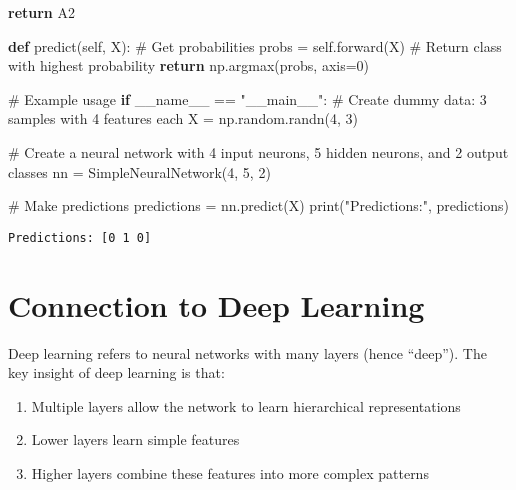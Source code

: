 \documentclass[
  letterpaper,
  DIV=11,
  numbers=noendperiod]{scrreprt}
\newenvironment{Shaded}{\begin{snugshade}}{\end{snugshade}}
\newcommand{\BuiltInTok}[1]{\textcolor[rgb]{0.00,0.23,0.31}{#1}}
\newcommand{\CommentTok}[1]{\textcolor[rgb]{0.37,0.37,0.37}{#1}}
\newcommand{\ControlFlowTok}[1]{\textcolor[rgb]{0.00,0.23,0.31}{\textbf{#1}}}
\newcommand{\DecValTok}[1]{\textcolor[rgb]{0.68,0.00,0.00}{#1}}
\newcommand{\KeywordTok}[1]{\textcolor[rgb]{0.00,0.23,0.31}{\textbf{#1}}}
\newcommand{\NormalTok}[1]{\textcolor[rgb]{0.00,0.23,0.31}{#1}}
\newcommand{\OperatorTok}[1]{\textcolor[rgb]{0.37,0.37,0.37}{#1}}
\newcommand{\StringTok}[1]{\textcolor[rgb]{0.13,0.47,0.30}{#1}}
\newcommand{\VariableTok}[1]{\textcolor[rgb]{0.07,0.07,0.07}{#1}}
\providecommand{\tightlist}{%
  \setlength{\itemsep}{0pt}\setlength{\parskip}{0pt}}\usepackage{longtable,booktabs,array}
\begin{document}
\begin{Shaded}
\begin{Highlighting}[]
        \ControlFlowTok{return}\NormalTok{ A2}
    
    \KeywordTok{def}\NormalTok{ predict(}\VariableTok{self}\NormalTok{, X):}
        \CommentTok{\# Get probabilities}
\NormalTok{        probs }\OperatorTok{=} \VariableTok{self}\NormalTok{.forward(X)}
        \CommentTok{\# Return class with highest probability}
        \ControlFlowTok{return}\NormalTok{ np.argmax(probs, axis}\OperatorTok{=}\DecValTok{0}\NormalTok{)}

\CommentTok{\# Example usage}
\ControlFlowTok{if} \VariableTok{\_\_name\_\_} \OperatorTok{==} \StringTok{"\_\_main\_\_"}\NormalTok{:}
    \CommentTok{\# Create dummy data: 3 samples with 4 features each}
\NormalTok{    X }\OperatorTok{=}\NormalTok{ np.random.randn(}\DecValTok{4}\NormalTok{, }\DecValTok{3}\NormalTok{)}
    
    \CommentTok{\# Create a neural network with 4 input neurons, 5 hidden neurons, and 2 output classes}
\NormalTok{    nn }\OperatorTok{=}\NormalTok{ SimpleNeuralNetwork(}\DecValTok{4}\NormalTok{, }\DecValTok{5}\NormalTok{, }\DecValTok{2}\NormalTok{)}
    
    \CommentTok{\# Make predictions}
\NormalTok{    predictions }\OperatorTok{=}\NormalTok{ nn.predict(X)}
    \BuiltInTok{print}\NormalTok{(}\StringTok{"Predictions:"}\NormalTok{, predictions)}
\end{Highlighting}
\end{Shaded}

\begin{verbatim}
Predictions: [0 1 0]
\end{verbatim}

\section{Connection to Deep Learning}\label{connection-to-deep-learning}

Deep learning refers to neural networks with many layers (hence
``deep''). The key insight of deep learning is that:

\begin{enumerate}
\def\labelenumi{\arabic{enumi}.}
\tightlist
\item
  Multiple layers allow the network to learn hierarchical
  representations
\item
  Lower layers learn simple features
\item
  Higher layers combine these features into more complex patterns
\end{enumerate}
\end{document}
